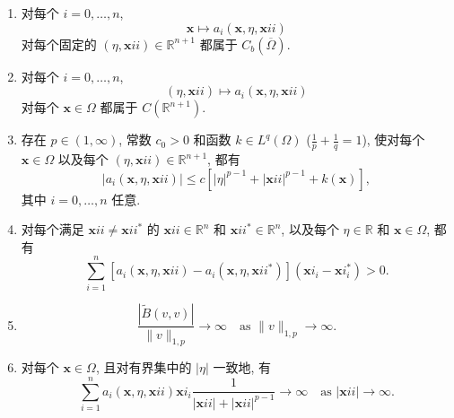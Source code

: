 \begin{enumerate}[label=HP-\arabic*.,ref=HP-\arabic*]\item\label{hyp:cv-pde-spatial-continuity} 对每个 $i=0,\ldots,n$,
\begin{equation}\label{eq:cv-pde-coefficient-spatial-continuity}
\bm{x}\mapsto a_i(\bm{x},\eta,\bm{x}ii)
\end{equation}
对每个固定的 $(\eta,\bm{x}ii)\in\mathbb{R}^{n+1}$ 都属于 $C_b(\overline\Omega)$.

\item\label{hyp:cv-pde-value-continuity} 对每个 $i=0,\ldots,n$,
\begin{equation}\label{eq:cv-pde-coefficient-value-gradient-continuity}
(\eta,\bm{x}ii)\mapsto a_i(\bm{x},\eta,\bm{x}ii)
\end{equation}
对每个 $\bm{x}\in\Omega$ 都属于 $C(\mathbb{R}^{n+1})$.

\item\label{hyp:cv-pde-growth} 存在 $p\in(1,\infty)$, 常数 $c_0>0$ 和函数 $k\in L^q(\Omega)$ ($\frac{1}{p}+\frac{1}{q}=1$), 使对每个 $\bm{x}\in\Omega$ 以及每个 $(\eta,\bm{x}ii)\in\mathbb{R}^{n+1}$, 都有
\begin{equation}\label{eq:cv-pde-coefficient-growth-bound}
|a_i(\bm{x},\eta,\bm{x}ii)|\leq c[|\eta|^{p-1}+|\bm{x}ii|^{p-1}+k(\bm{x})],
\end{equation}
其中 $i=0,\ldots,n$ 任意.

\item\label{hyp:cv-pde-strict-gradient-monotonicity} 对每个满足 $\bm{x}ii\neq\bm{x}ii^*$ 的 $\bm{x}ii\in\mathbb{R}^n$ 和 $\bm{x}ii^*\in\mathbb{R}^n$, 以及每个 $\eta\in\mathbb{R}$ 和 $\bm{x}\in\Omega$, 都有
\begin{equation}\label{eq:cv-pde-strict-highest-order-monotonicity}
\sum_{i=1}^n[a_i(\bm{x},\eta,\bm{x}ii)-a_i(\bm{x},\eta,\bm{x}ii^*)](\bm{x}i_i-\bm{x}i_i^*)>0.
\end{equation}


\item\label{hyp:cv-pde-form-coercivity}
\begin{equation}\label{eq:cv-pde-absolute-bivariate-coercivity-hypothesis}
\dfrac{|\widetilde B(v,v)|}{\|v\|_{1,p}}\to\infty\quad\text{as }\|v\|_{1,p}\to\infty.
\end{equation}


\item\label{hyp:cv-pde-uniform-gradient-coercivity} 对每个 $\bm{x}\in\Omega$, 且对有界集中的 $|\eta|$ 一致地, 有
\begin{equation}\label{eq:cv-pde-uniform-gradient-coercivity-hypothesis}
\sum_{i=1}^na_i(\bm{x},\eta,\bm{x}ii)\bm{x}i_i\dfrac{1}{|\bm{x}ii|+|\bm{x}ii|^{p-1}}\to\infty\quad\text{as }|\bm{x}ii|\to\infty.
\end{equation}
\end{enumerate}

